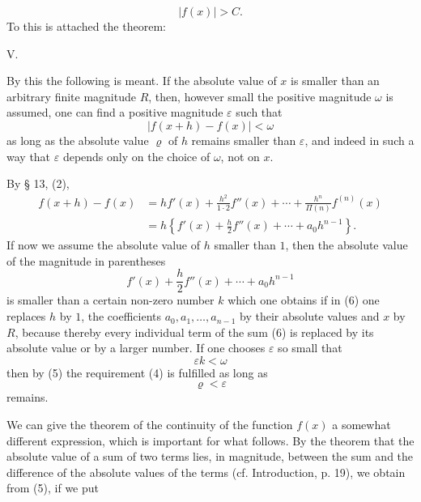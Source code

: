 
\begin{equation}
 |f(x)|>C.
\tag{3}
\end{equation}
To this is attached the theorem:

\medskip
\noindent V. 
\medskip

By this the following is meant. If the absolute value of $x$ is smaller than an arbitrary finite magnitude $R$, then, however small the positive magnitude $\omega$ is assumed, one can find a positive magnitude $\varepsilon$ such that
\begin{equation}
 |f(x+h)-f(x)|<\omega
\tag{4}
\end{equation}
as long as the absolute value $\varrho$ of $h$ remains smaller than $\varepsilon$, and indeed in such a way that $\varepsilon$ depends only on the choice of $\omega$, not on $x$.

By § 13, (2),
\begin{equation}
\begin{split}
 f(x+h)-f(x)&=h f'(x)+\frac{h^2}{1\cdot2}f''(x)+\cdots+\frac{h^n}{\Pi(n)}f^{(n)}(x)\\
 &=h\left\{f'(x)+\frac{h}{2}f''(x)+\cdots+a_0h^{n-1}\right\}.
\end{split}
\tag{5}
\end{equation}
If now we assume the absolute value of $h$ smaller than $1$, then the absolute value of the magnitude in parentheses
\begin{equation}
 f'(x)+\frac{h}{2}f''(x)+\cdots+a_0h^{n-1}
\tag{6}
\end{equation}
is smaller than a certain non-zero number $k$ which one obtains if in (6) one replaces $h$ by $1$, the coefficients $a_0,a_1,\ldots,a_{n-1}$ by their absolute values and $x$ by $R$, because thereby every individual term of the sum (6) is replaced by its absolute value or by a larger number. If one chooses $\varepsilon$ so small that
\[
 \varepsilon k<\omega
\]
then by (5) the requirement (4) is fulfilled as long as
\[
 \varrho<\varepsilon
\]
remains.

We can give the theorem of the continuity of the function $f(x)$ a somewhat different expression, which is important for what follows. By the theorem that the absolute value of a sum of two terms lies, in magnitude, between the sum and the difference of the absolute values of the terms (cf. Introduction, p. 19), we obtain from (5), if we put
